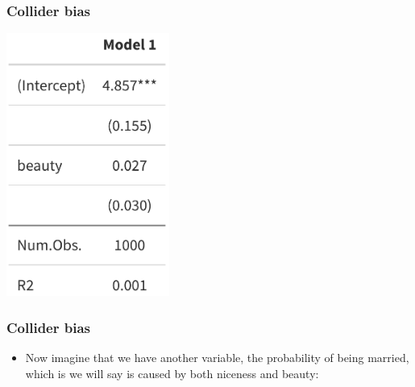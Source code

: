\documentclass[aspectratio=43]{beamer}
\begin{document}
\begin{frame}
\frametitle{Collider bias}
\centering

\includegraphics[width = 0.4\textwidth]{../img/collider_m1}

\end{frame}

\begin{frame}
\frametitle{Collider bias}
\centering

\begin{itemize}
  \item Now imagine that we have another variable, the probability of being married, which is we will say is caused by both niceness and beauty:
\end{itemize}



\end{frame}
\end{document}
